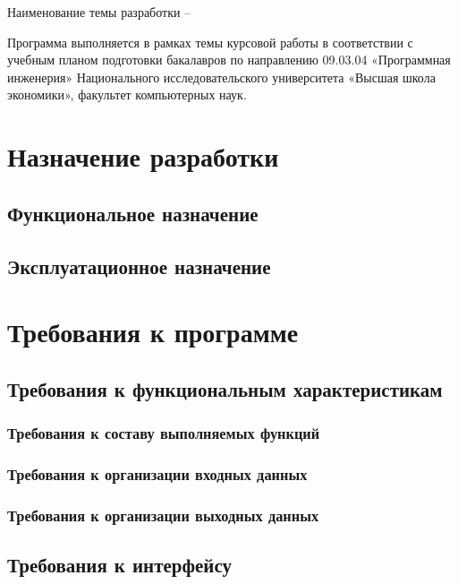 \documentclass[a4paper,12pt,reqno]{article}
\begin{document}
	Наименование темы разработки – {\color{red}{TODO}}


 Программа выполняется в рамках темы курсовой работы в соответствии с учебным планом подготовки бакалавров по направлению 09.03.04 «Программная инженерия» Национального исследовательского университета «Высшая школа экономики», факультет компьютерных наук.
	
	\newpage 
	\section{Назначение разработки}
	 
	\subsection{Функциональное назначение}
	{\color{red}{TODO}}
	\subsection{Эксплуатационное назначение}
	{\color{red}{TODO}}
	
						\newpage
	\section{Требования к программе}
	\subsection{Требования к функциональным характеристикам}
	\subsubsection{Требования к составу выполняемых функций}
	
	{\color{red}{TODO}}
	\subsubsection{Требования к организации входных данных}
	{\color{red}{TODO}}
	\subsubsection{Требования к организации выходных данных}
	{\color{red}{TODO}}
	\clearpage
	\subsection{Требования к интерфейсу}
	{\color{red}{TODO}}
\end{document}
